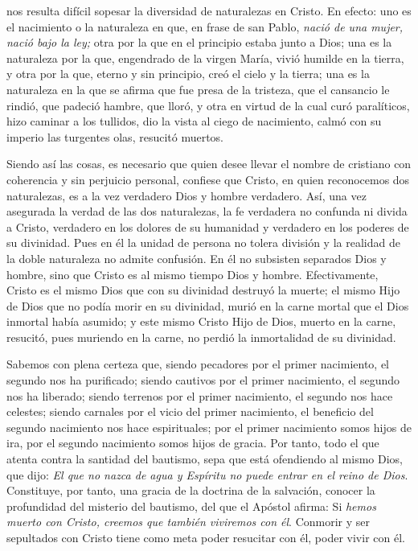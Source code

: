 \begin{body}
	 nos resulta difícil sopesar la diversidad de naturalezas en Cristo. En efecto: uno es el nacimiento o la naturaleza en que, en frase de san Pablo, \emph{nació de una mujer, nació bajo la ley;} otra por la que en el principio estaba junto a Dios; una es la naturaleza por la que, engendrado de la virgen María, vivió humilde en la tierra, y otra por la que, eterno y sin principio, creó el cielo y la tierra; una es la naturaleza en la que se afirma que fue presa de la tristeza, que el cansancio le rindió, que padeció hambre, que lloró, y otra en virtud de la cual curó paralíticos, hizo caminar a los tullidos, dio la vista al ciego de nacimiento, calmó con su imperio las turgentes olas, resucitó muertos.
	
	Siendo así las cosas, es necesario que quien desee llevar el nombre de cristiano con coherencia y sin perjuicio personal, confiese que Cristo, en quien reconocemos dos naturalezas, es a la vez verdadero Dios y hombre verdadero. Así, una vez asegurada la verdad de las dos naturalezas, la fe verdadera no confunda ni divida a Cristo, verdadero en los dolores de su humanidad y verdadero en los poderes de su divinidad. Pues en él la unidad de persona no tolera división y la realidad de la doble naturaleza no admite confusión. En él no subsisten separados Dios y hombre, sino que Cristo es al mismo tiempo Dios y hombre. Efectivamente, Cristo es el mismo Dios que con su divinidad destruyó la muerte; el mismo Hijo de Dios que no podía morir en su divinidad, murió en la carne mortal que el Dios inmortal había asumido; y este mismo Cristo Hijo de Dios, muerto en la carne, resucitó, pues muriendo en la carne, no perdió la inmortalidad de su divinidad.
	
	Sabemos con plena certeza que, siendo pecadores por el primer nacimiento, el segundo nos ha purificado; siendo cautivos por el primer nacimiento, el segundo nos ha liberado; siendo terrenos por el primer nacimiento, el segundo nos hace celestes; siendo carnales por el vicio del primer nacimiento, el beneficio del segundo nacimiento nos hace espirituales; por el primer nacimiento somos hijos de ira, por el segundo nacimiento somos hijos de gracia. Por tanto, todo el que atenta contra la santidad del bautismo, sepa que está ofendiendo al mismo Dios, que dijo: \emph{El que no nazca de agua y Espíritu no puede entrar en el reino de Dios}. Constituye, por tanto, una gracia de la doctrina de la salvación, conocer la profundidad del misterio del bautismo, del que el Apóstol afirma: Si \emph{hemos muerto con Cristo, creemos que también viviremos con él}. Conmorir y ser sepultados con Cristo tiene como meta poder resucitar con él, poder vivir con él.
\end{body}


